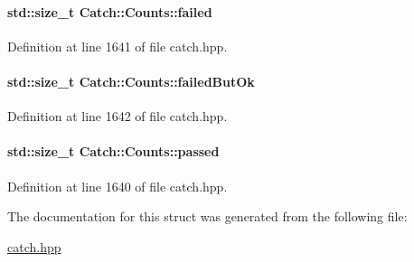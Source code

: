 \paragraph[{failed}]{\setlength{\rightskip}{0pt plus 5cm}std\+::size\+\_\+t Catch\+::\+Counts\+::failed}\label{a00015_a19982a3817a3bc2c07f0290e71f497a3}


Definition at line 1641 of file catch.\+hpp.

\hypertarget{a00015_ac090973a2ff51394cd452718e75c073e}{}
\paragraph[{failed\+But\+Ok}]{\setlength{\rightskip}{0pt plus 5cm}std\+::size\+\_\+t Catch\+::\+Counts\+::failed\+But\+Ok}\label{a00015_ac090973a2ff51394cd452718e75c073e}


Definition at line 1642 of file catch.\+hpp.

\hypertarget{a00015_ad28daaf3de28006400208b6dd0c631e6}{}
\paragraph[{passed}]{\setlength{\rightskip}{0pt plus 5cm}std\+::size\+\_\+t Catch\+::\+Counts\+::passed}\label{a00015_ad28daaf3de28006400208b6dd0c631e6}


Definition at line 1640 of file catch.\+hpp.



The documentation for this struct was generated from the following file\+:\begin{DoxyCompactItemize}
\item 
\hyperlink{a00094}{catch.\+hpp}\end{DoxyCompactItemize}
